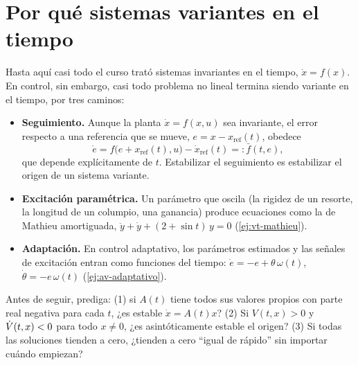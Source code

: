 \section{Por qué sistemas variantes en el tiempo}
\label{sec:vt-porque}

Hasta aquí casi todo el curso trató sistemas invariantes en el tiempo, $\dot x=f(x)$. En control, sin embargo, casi todo problema no lineal termina siendo variante en el tiempo, por tres caminos:
\begin{itemize}
  \item \textbf{Seguimiento.} Aunque la planta $\dot x=f(x,u)$ sea invariante, el error respecto a una referencia que se mueve, $e=x-x_{\mathrm{ref}}(t)$, obedece
  \begin{equation}
    \dot e=f\bigl(e+x_{\mathrm{ref}}(t),u\bigr)-\dot x_{\mathrm{ref}}(t)=:\bar f(t,e) ,
    \label{eq:vt-seguimiento}
  \end{equation}
  que depende explícitamente de $t$. Estabilizar el seguimiento es estabilizar el origen de un sistema variante.
  \item \textbf{Excitación paramétrica.} Un parámetro que oscila (la rigidez de un resorte, la longitud de un columpio, una ganancia) produce ecuaciones como la de Mathieu amortiguada, $\ddot y+\dot y+(2+\sin t)\,y=0$ (\cref{ej:vt-mathieu}).
  \item \textbf{Adaptación.} En control adaptativo, los parámetros estimados y las señales de excitación entran como funciones del tiempo: $\dot e=-e+\theta\,\omega(t)$, $\dot\theta=-e\,\omega(t)$ (\cref{ej:av-adaptativo}).
\end{itemize}

\begin{pausa}
Antes de seguir, prediga: (1) si $A(t)$ tiene todos sus valores propios con parte real negativa para cada $t$, ¿es estable $\dot x=A(t)x$? (2) Si $V(t,x)>0$ y $\dot V(t,x)<0$ para todo $x\neq0$, ¿es asintóticamente estable el origen? (3) Si todas las soluciones tienden a cero, ¿tienden a cero ``igual de rápido'' sin importar cuándo empiezan?
\end{pausa}

